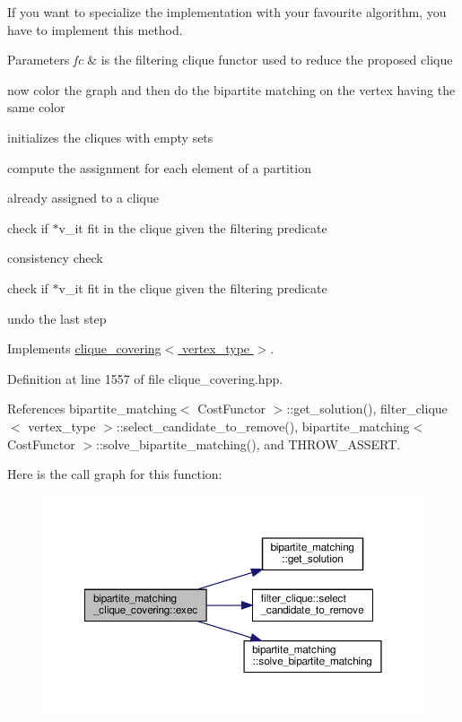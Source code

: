 If you want to specialize the implementation with your favourite algorithm, you have to implement this method. 
\begin{DoxyParams}{Parameters}
{\em fc} & is the filtering clique functor used to reduce the proposed clique \\
\hline
\end{DoxyParams}
now color the graph and then do the bipartite matching on the vertex having the same color

initializes the cliques with empty sets

compute the assignment for each element of a partition

already assigned to a clique

check if $\ast$v\+\_\+it fit in the clique given the filtering predicate

consistency check

check if $\ast$v\+\_\+it fit in the clique given the filtering predicate

undo the last step 

Implements \hyperlink{classclique__covering_a54c35fc0f400f32f3d412783685150ef}{clique\+\_\+covering$<$ vertex\+\_\+type $>$}.



Definition at line 1557 of file clique\+\_\+covering.\+hpp.



References bipartite\+\_\+matching$<$ Cost\+Functor $>$\+::get\+\_\+solution(), filter\+\_\+clique$<$ vertex\+\_\+type $>$\+::select\+\_\+candidate\+\_\+to\+\_\+remove(), bipartite\+\_\+matching$<$ Cost\+Functor $>$\+::solve\+\_\+bipartite\+\_\+matching(), and T\+H\+R\+O\+W\+\_\+\+A\+S\+S\+E\+RT.

Here is the call graph for this function\+:
\nopagebreak
\begin{figure}[H]
\begin{center}
\leavevmode
\includegraphics[width=350pt]{d1/df2/classbipartite__matching__clique__covering_aa4caf6d3d3f37c7157f80c2e4d145a4e_cgraph}
\end{center}
\end{figure}
\mbox{\label{classbipartite__matching__clique__covering_ac0e15a14d2f5e861835c2bc74dfeff79}} 
